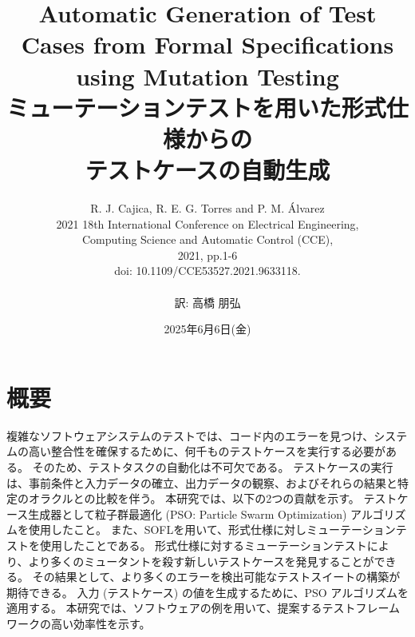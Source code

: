 \documentclass[uplatex, twocolumn, 10pt]{jsarticle} %
\begin{document}
\title{Automatic Generation of Test Cases from Formal Specifications using Mutation Testing \\
    ミューテーションテストを用いた形式仕様からの\\テストケースの自動生成}
\author{R. J. Cajica, R. E. G. Torres and P. M. \'Alvarez\\
    2021 18th International Conference on Electrical Engineering,\\ Computing Science and Automatic Control (CCE),\\ 2021, pp.1-6\\
    doi: 10.1109/CCE53527.2021.9633118.\\\\ 訳: 高橋 朋弘}
\date{2025年6月6日(金)}
\maketitle

\section*{概要} %
複雑なソフトウェアシステムのテストでは、コード内のエラーを見つけ、システムの高い整合性を確保するために、何千ものテストケースを実行する必要がある。
そのため、テストタスクの自動化は不可欠である。
テストケースの実行は、事前条件と入力データの確立、出力データの観察、およびそれらの結果と特定のオラクルとの比較を伴う。
本研究では、以下の2つの貢献を示す。
テストケース生成器として粒子群最適化 (PSO: Particle Swarm Optimization) アルゴリズムを使用したこと。
また、SOFLを用いて、形式仕様に対しミューテーションテストを使用したことである。
形式仕様に対するミューテーションテストにより、より多くのミュータントを殺す新しいテストケースを発見することができる。
その結果として、より多くのエラーを検出可能なテストスイートの構築が期待できる。
入力 (テストケース) の値を生成するために、PSO アルゴリズムを適用する。
本研究では、ソフトウェアの例を用いて、提案するテストフレームワークの高い効率性を示す。
\end{document}

